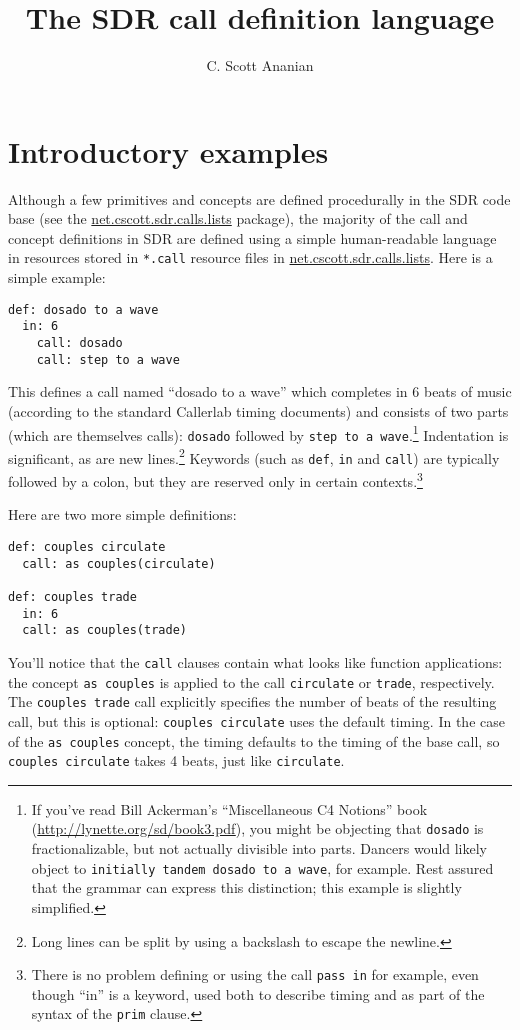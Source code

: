 \documentclass[12pt]{article}
\title{The SDR call definition language}
\author{C. Scott Ananian}
\date{}
\newcommand{\clause}[1]{\texttt{#1}}
\renewcommand{\call}[1]{\texttt{#1}} %
\newcommand{\package}[1]{\url{#1}}
\begin{document}
\maketitle

\section{Introductory examples}

Although a few primitives and concepts are defined procedurally in the
SDR code base (see the \package{net.cscott.sdr.calls.lists}
package), the majority of the call and concept definitions in SDR are
defined using a simple human-readable language in resources stored
in \texttt{*.call} resource files in \package{net.cscott.sdr.calls.lists}.
Here is a simple example:
\begin{verbatim}
def: dosado to a wave
  in: 6
    call: dosado
    call: step to a wave
\end{verbatim}

This defines a call named ``dosado to a wave'' which completes in 6
beats of music (according to the standard Callerlab timing documents)
and consists of two parts (which are themselves calls): \call{dosado}
followed by \call{step to a wave}.\footnote{If you've read Bill
  Ackerman's ``Miscellaneous C4 Notions'' book
  (\url{http://lynette.org/sd/book3.pdf}), you might be objecting that
  \call{dosado} is fractionalizable, but not actually divisible into
  parts.  Dancers would likely object to \call{initially tandem dosado
    to a wave}, for example.  Rest assured that the grammar can
  express this distinction; this example is slightly simplified.}
Indentation is significant, as are new lines.\footnote{Long lines can
  be split by using a backslash to escape the newline.}
Keywords (such as \clause{def}, \clause{in} and \clause{call}) are
typically followed by a colon, but they are reserved only in certain
contexts.\footnote{There is no problem defining or using the call
  \call{pass in} for example, even though ``in'' is a keyword, used both
  to describe timing and as part of the syntax of the \clause{prim}  clause.}

Here are two more simple definitions:
\begin{verbatim}
def: couples circulate
  call: as couples(circulate)

def: couples trade
  in: 6
  call: as couples(trade)
\end{verbatim}

You'll notice that the \clause{call} clauses contain what looks like
function applications: the concept \call{as couples} is applied to
the call \call{circulate} or \call{trade}, respectively.  The
\call{couples trade} call explicitly specifies the number of beats of
the resulting call, but this is optional: \call{couples circulate}
uses the default timing.  In the case of the \call{as couples}
concept, the timing defaults to the timing of the base call, so
\call{couples circulate} takes 4 beats, just like \call{circulate}.
\end{document}
